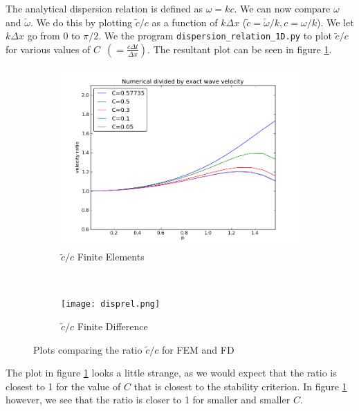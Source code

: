 \documentclass[twoside]{article}
\newcommand{\dt}{\Delta t}
\newcommand{\dx}{\Delta x}
\newcommand{\wt}{\tilde{\omega}}
\begin{document}
The analytical dispersion relation is defined as $\omega = k c$. We can now compare $\omega$ and $\wt$. We do this by plotting $\tilde{c}/c$ as a function of $k\dx$ ($\tilde{c} = \wt/k, c = \omega/k$). We let $k\dx$ go from $0$ to $\pi/2$. We the program \texttt{dispersion\_relation\_1D.py} to plot $\tilde{c}/c$ for various values of $C\,\,\,(=\frac{c\dt}{\dx})$. The resultant plot can be seen in figure \ref{c:plot:fem}.

\begin{figure}
        \centering
        \begin{subfigure}[b]{0.55\textwidth}
                \centering
                \includegraphics[width=\textwidth]{plot.png}
                \caption{$\tilde{c}/c$ Finite Elements}
                \label{c:plot:fem}
        \end{subfigure}%
        ~ %
        \begin{subfigure}[b]{0.55\textwidth}
                \centering
                \texttt{[image: disprel.png]}
                \caption{$\tilde{c}/c$ Finite Difference}
                \label{c:plot:fd}
        \end{subfigure}
        \caption{Plots comparing the ratio $\tilde{c}/c$ for FEM and FD}\label{c:plots}
\end{figure}

The plot in figure \ref{c:plot:fem} looks a little strange, as we would expect that the ratio is closest to 1 for the value of $C$ that is closest to the stability criterion. In figure \ref{c:plot:fem} however, we see that the ratio is closer to 1 for smaller and smaller $C$.
\end{document}
